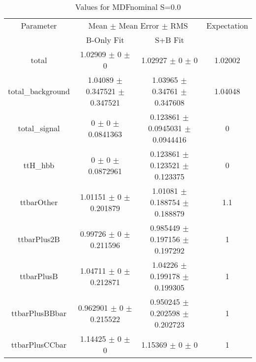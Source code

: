 \begin{table}
\centering
\caption{Values for MDFnominal S=0.0}
\begin{tabular}{cccc}
\toprule
Parameter & \multicolumn{2}{c}{Mean $\pm$ Mean Error $\pm$ RMS} & Expectation\\
 & B-Only Fit & S+B Fit & \\
\midrule
total & \num{1.02909} $\pm$ \num{0} $\pm$ \num{0} & \num{1.02927} $\pm$ \num{0} $\pm$ \num{0} & \num{1.02002}\\
total\_background & \num{1.04089} $\pm$ \num{0.347521} $\pm$ \num{0.347521} & \num{1.03965} $\pm$ \num{0.34761} $\pm$ \num{0.347608} & \num{1.04048}\\
total\_signal & \num{0} $\pm$ \num{0} $\pm$ \num{0.0841363} & \num{0.123861} $\pm$ \num{0.0945031} $\pm$ \num{0.0944416} & \num{0}\\
ttH\_hbb & \num{0} $\pm$ \num{0} $\pm$ \num{0.0872961} & \num{0.123861} $\pm$ \num{0.123521} $\pm$ \num{0.123375} & \num{0}\\
ttbarOther & \num{1.01151} $\pm$ \num{0} $\pm$ \num{0.201879} & \num{1.01081} $\pm$ \num{0.188754} $\pm$ \num{0.188879} & \num{1.1}\\
ttbarPlus2B & \num{0.99726} $\pm$ \num{0} $\pm$ \num{0.211596} & \num{0.985449} $\pm$ \num{0.197156} $\pm$ \num{0.197292} & \num{1}\\
ttbarPlusB & \num{1.04711} $\pm$ \num{0} $\pm$ \num{0.212871} & \num{1.04226} $\pm$ \num{0.199178} $\pm$ \num{0.199305} & \num{1}\\
ttbarPlusBBbar & \num{0.962901} $\pm$ \num{0} $\pm$ \num{0.215522} & \num{0.950245} $\pm$ \num{0.202598} $\pm$ \num{0.202723} & \num{1}\\
ttbarPlusCCbar & \num{1.14425} $\pm$ \num{0} $\pm$ \num{0} & \num{1.15369} $\pm$ \num{0} $\pm$ \num{0} & \num{1}\\
\bottomrule
\end{tabular}
\end{table}